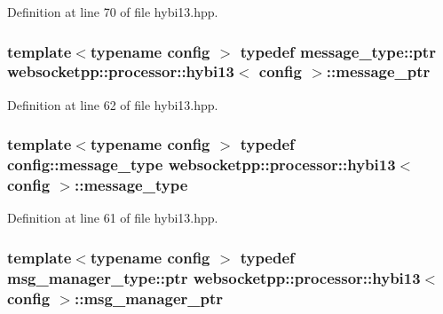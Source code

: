 Definition at line 70 of file hybi13.\+hpp.

\hypertarget{classwebsocketpp_1_1processor_1_1hybi13_a0571e90d7261ab722f695feb7dd48fed}{}
\subsubsection[{message\+\_\+ptr}]{\setlength{\rightskip}{0pt plus 5cm}template$<$typename config $>$ typedef message\+\_\+type\+::ptr {\bf websocketpp\+::processor\+::hybi13}$<$ config $>$\+::{\bf message\+\_\+ptr}}\label{classwebsocketpp_1_1processor_1_1hybi13_a0571e90d7261ab722f695feb7dd48fed}


Definition at line 62 of file hybi13.\+hpp.

\hypertarget{classwebsocketpp_1_1processor_1_1hybi13_a547b5e5f405468b36b9027f0e973fa15}{}
\subsubsection[{message\+\_\+type}]{\setlength{\rightskip}{0pt plus 5cm}template$<$typename config $>$ typedef config\+::message\+\_\+type {\bf websocketpp\+::processor\+::hybi13}$<$ config $>$\+::{\bf message\+\_\+type}}\label{classwebsocketpp_1_1processor_1_1hybi13_a547b5e5f405468b36b9027f0e973fa15}


Definition at line 61 of file hybi13.\+hpp.

\hypertarget{classwebsocketpp_1_1processor_1_1hybi13_a435c6586650330e0f1685da6b4e70a68}{}
\subsubsection[{msg\+\_\+manager\+\_\+ptr}]{\setlength{\rightskip}{0pt plus 5cm}template$<$typename config $>$ typedef msg\+\_\+manager\+\_\+type\+::ptr {\bf websocketpp\+::processor\+::hybi13}$<$ config $>$\+::{\bf msg\+\_\+manager\+\_\+ptr}}\label{classwebsocketpp_1_1processor_1_1hybi13_a435c6586650330e0f1685da6b4e70a68}


